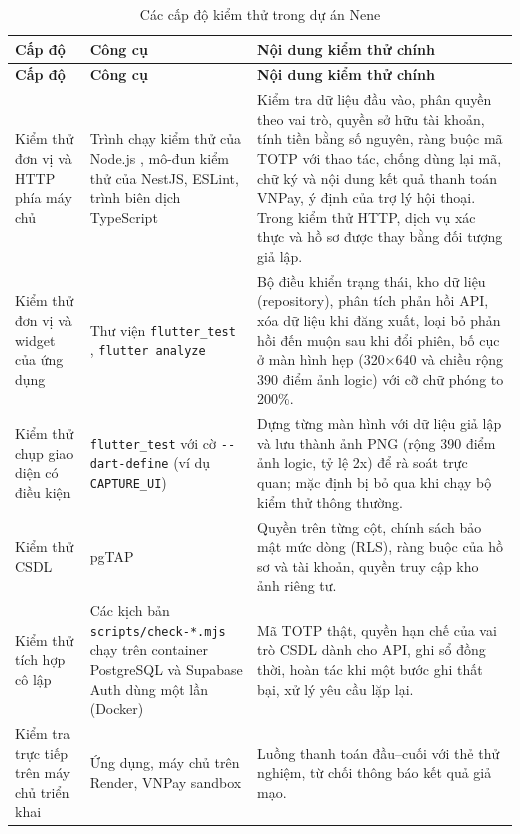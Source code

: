 \begingroup
\linespread{1.15}\small
\begin{longtable}{@{}p{3.4cm} p{3.6cm} p{7.6cm}@{}}
	\caption{Các cấp độ kiểm thử trong dự án Nene}
	\label{tab:ch5-cap-do} \\
	\toprule
	\textbf{Cấp độ} & \textbf{Công cụ} & \textbf{Nội dung kiểm thử chính} \\
	\midrule
	\endfirsthead
	\toprule
	\textbf{Cấp độ} & \textbf{Công cụ} & \textbf{Nội dung kiểm thử chính} \\
	\midrule
	\endhead
	\bottomrule
	\endfoot
	Kiểm thử đơn vị và HTTP phía máy chủ & Trình chạy kiểm thử của Node.js \parencite{ch3-node-test}, mô-đun kiểm thử của NestJS, ESLint, trình biên dịch TypeScript & Kiểm tra dữ liệu đầu vào, phân quyền theo vai trò, quyền sở hữu tài khoản, tính tiền bằng số nguyên, ràng buộc mã TOTP với thao tác, chống dùng lại mã, chữ ký và nội dung kết quả thanh toán VNPay, ý định của trợ lý hội thoại. Trong kiểm thử HTTP, dịch vụ xác thực và hồ sơ được thay bằng đối tượng giả lập. \\
	\midrule
	Kiểm thử đơn vị và widget của ứng dụng & Thư viện \texttt{flutter\_\allowbreak{}test} \parencite{ch3-flutter-testing}, \texttt{flutter analyze} & Bộ điều khiển trạng thái, kho dữ liệu (repository), phân tích phản hồi API, xóa dữ liệu khi đăng xuất, loại bỏ phản hồi đến muộn sau khi đổi phiên, bố cục ở màn hình hẹp (320$\times$640 và chiều rộng 390 điểm ảnh logic) với cỡ chữ phóng to 200\%. \\
	\midrule
	Kiểm thử chụp giao diện có điều kiện & \texttt{flutter\_\allowbreak{}test} với cờ \texttt{-{}-dart-\allowbreak{}define} (ví dụ \texttt{CAPTURE\_\allowbreak{}UI}) & Dựng từng màn hình với dữ liệu giả lập và lưu thành ảnh PNG (rộng 390 điểm ảnh logic, tỷ lệ 2x) để rà soát trực quan; mặc định bị bỏ qua khi chạy bộ kiểm thử thông thường. \\
	\midrule
	Kiểm thử CSDL & pgTAP \parencite{ch5-pgtap} & Quyền trên từng cột, chính sách bảo mật mức dòng (RLS), ràng buộc của hồ sơ và tài khoản, quyền truy cập kho ảnh riêng tư. \\
	\midrule
	Kiểm thử tích hợp cô lập & Các kịch bản \texttt{scripts/\allowbreak{}check-*.\allowbreak{}mjs} chạy trên container PostgreSQL và Supabase Auth dùng một lần (Docker) & Mã TOTP thật, quyền hạn chế của vai trò CSDL dành cho API, ghi sổ đồng thời, hoàn tác khi một bước ghi thất bại, xử lý yêu cầu lặp lại. \\
	\midrule
	Kiểm tra trực tiếp trên máy chủ triển khai & Ứng dụng, máy chủ trên Render, VNPay sandbox & Luồng thanh toán đầu--cuối với thẻ thử nghiệm, từ chối thông báo kết quả giả mạo. \\
\end{longtable}
\endgroup

